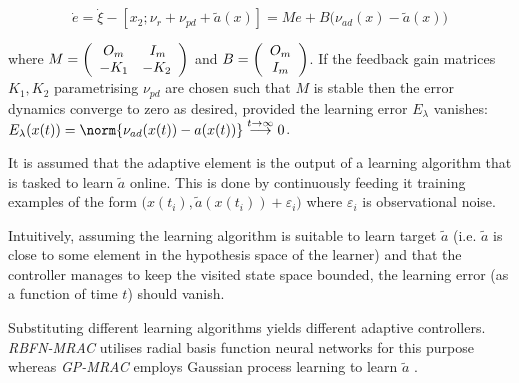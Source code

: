 \begin{equation}\label{eq:errordynmrac}
	\dot e = \dot \xi - [x_2; \nu_r + \nu_{pd}+ \tilde a(x) ] = M e + B \bigl(\nu_{ad}(x) -  \tilde a(x)\bigr)
\end{equation}


where $M = \left(\begin{array}[h]{cc}
			O_m &  \, I_{m}\\
			-K_1 & -K_2 
					\end{array}\right)$ and $B = \left(\begin{array}[h]{c}
			O_m \\ I_m
					\end{array}\right)$.
If the feedback gain matrices $K_1,K_2$ parametrising $\nu_{pd}$ are chosen such that $M$ is stable then the error dynamics converge to zero as desired, provided the learning error $E_\lambda$ vanishes: $E_\lambda (x(t)) = \norm{\nu_{ad}(x(t)) -  a(x(t))} \stackrel{t \to \infty} {\longrightarrow} 0$. 

It is assumed that the adaptive element is the output of a learning algorithm that is tasked to learn $\tilde a$ online. This is done by continuously feeding it training examples of the form $\bigl(x(t_i), \tilde a(x(t_i)) + \varepsilon_i\bigr)$ where $\varepsilon_i$ is observational noise.  

Intuitively, assuming the learning algorithm is suitable to learn target $\tilde a$ (i.e. $\tilde a$ is close to some element in the hypothesis space \cite{mitchellbook:97} of the learner) and that the controller manages to keep the visited state space bounded, the learning error (as a function of time $t$) should vanish.

Substituting different learning algorithms yields different adaptive controllers. \textit{RBFN-MRAC} \cite{Kim1998} utilises radial basis function neural networks for this purpose whereas \textit{GP-MRAC} 
employs Gaussian process learning \cite{GPbook:2006} to learn $\tilde a$ \cite{Chowdhary2013,ChowdharyCDC2013}. 


